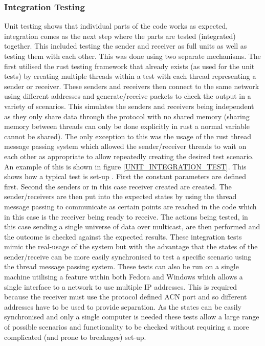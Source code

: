 \documentclass[11pt,a4paper]{report}
\begin{document}
\subsubsection{Integration Testing}
Unit testing shows that individual parts of the code works as expected, integration comes as the next step where the parts are tested (integrated) together. This included testing the sender and receiver as full units as well as testing them with each other. This was done using two separate mechanisms. The first utilised the rust testing framework that already exists (as used for the unit tests) by creating multiple threads within a test with each thread representing a sender or receiver. These senders and receivers then connect to the same network using different addresses and generate/receive packets to check the output in a variety of scenarios. This simulates the senders and receivers being independent as they only share data through the protocol with no shared memory (sharing memory between threads can only be done explicitly in rust a normal variable cannot be shared). The only exception to this was the usage of the rust thread message passing system which allowed the sender/receiver threads to wait on each other as appropriate to allow repeatedly creating the desired test scenario. An example of this is shown in figure \ref{UNIT_INTEGRATION_TEST}. This shows how a typical test is set-up . First the constant parameters are defined first. Second the senders or in this case receiver created are created. The sender/receivers are then put into the expected states by using the thread message passing to communicate as certain points are reached in the code which in this case is the receiver being ready to receive. The actions being tested, in this case sending a single universe of data over multicast, are then performed and the outcome is checked against the expected results. These integration tests mimic the real-usage of the system but with the advantage that the states of the sender/receive can be more easily synchronised to test a specific scenario using the thread message passing system. These tests can also be run on a single machine utilising a feature within both Fedora and Windows which allows a single interface to a network to use multiple IP addresses. This is required because the receiver must use the protocol defined ACN port and so different addresses have to be used to provide separation. As the states can be easily synchronised and only a single computer is needed these tests allow a large range of possible scenarios and functionality to be checked without requiring a more complicated (and prone to breakages) set-up. 
\end{document}
